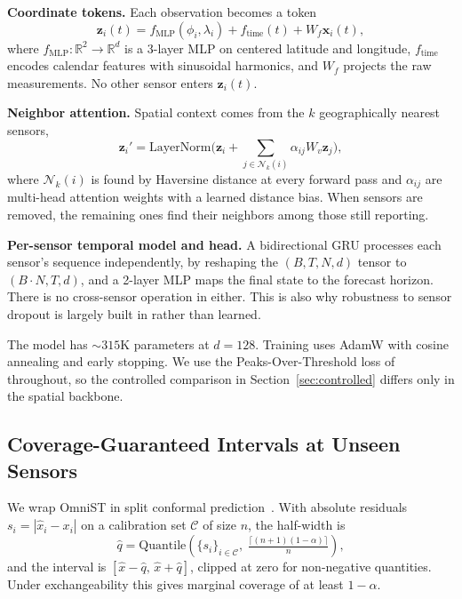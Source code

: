 \documentclass[journal,twoside,web]{ieeecolor}
\begin{document}
\textbf{Coordinate tokens.} Each observation becomes a token
\begin{equation}
\mathbf{z}_i(t) = f_{\text{MLP}}(\phi_i, \lambda_i) + f_{\text{time}}(t) + W_f \mathbf{x}_i(t),
\end{equation}
where $f_{\text{MLP}}:\mathbb{R}^2\to\mathbb{R}^d$ is a 3-layer MLP on centered latitude and longitude,
$f_{\text{time}}$ encodes calendar features with sinusoidal harmonics, and $W_f$ projects the raw
measurements. No other sensor enters $\mathbf{z}_i(t)$.

\textbf{Neighbor attention.} Spatial context comes from the $k$ geographically nearest sensors,
\begin{equation}
\mathbf{z}_i' = \text{LayerNorm}\Big(\mathbf{z}_i + \sum_{j \in \mathcal{N}_k(i)} \alpha_{ij} W_v \mathbf{z}_j\Big),
\end{equation}
where $\mathcal{N}_k(i)$ is found by Haversine distance at every forward pass and $\alpha_{ij}$ are
multi-head attention weights with a learned distance bias. When sensors are removed, the remaining
ones find their neighbors among those still reporting.

\textbf{Per-sensor temporal model and head.} A bidirectional GRU processes each sensor's sequence
independently, by reshaping the $(B,T,N,d)$ tensor to $(B{\cdot}N,T,d)$, and a 2-layer MLP maps the
final state to the forecast horizon. There is no cross-sensor operation in either. This is also why
robustness to sensor dropout is largely built in rather than learned.

The model has ${\sim}315$K parameters at $d{=}128$. Training uses AdamW with cosine annealing and
early stopping. We use the Peaks-Over-Threshold loss of~\cite{panja2026estgcn} throughout, so the
controlled comparison in Section~\ref{sec:controlled} differs only in the spatial backbone.

\subsection{Coverage-Guaranteed Intervals at Unseen Sensors}
\label{sec:conformal}

We wrap OmniST in split conformal prediction~\cite{vovk2005algorithmic,angelopoulos2023conformal}.
With absolute residuals $s_i = |\hat{x}_i - x_i|$ on a calibration set $\mathcal{C}$ of size $n$, the
half-width is
\begin{equation}
\hat{q} = \mathrm{Quantile}\!\left(\{s_i\}_{i \in \mathcal{C}},\; \tfrac{\lceil (n+1)(1-\alpha)\rceil}{n}\right),
\end{equation}
and the interval is $[\hat{x} - \hat{q},\, \hat{x} + \hat{q}]$, clipped at zero for non-negative
quantities. Under exchangeability this gives marginal coverage of at least $1-\alpha$.
\end{document}
